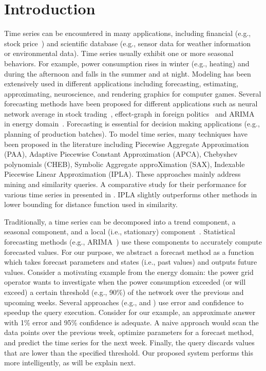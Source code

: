 \documentclass[10pt,conference,letterpaper]{IEEEtran}
\begin{document}
\section{Introduction}
  \label{sec:intro}
Time series can be encountered in many applications, including financial (e.g., stock price~\cite{stock}) and scientific database (e.g.,
sensor data for weather information~\cite{arimaEng} or environmental data).
Time series usually exhibit one or more seasonal behaviors. For example, power consumption rises in winter (e.g., heating) and during the afternoon and falls in the summer and at night. Modeling has been extensively used in different applications including forecasting, estimating, approximating, neuroscience, and rendering graphics for computer games.  Several  forecasting methods have been proposed for different applications such as neural network  average in stock trading~\cite{stock},  effect-graph in foreign politics~\cite{iran} and ARIMA~\cite{tBOX76a} in energy domain~\cite{arimaEng}.  Forecasting is essential for  decision making applications (e.g., planning of production batches). To model time series, many techniques have been proposed in the literature including Piecewise Aggregate Approximation (PAA), Adaptive Piecewise Constant Approximation (APCA), Chebyshev polynomials (CHEB), Symbolic Aggregate approXimation (SAX), Indexable Piecewise Linear Approximation (IPLA).  These approaches mainly address mining and similarity  queries.  A comparative study for their performance for various time series in presented in \cite{DTPE08}. IPLA slightly outperforms other methods in lower bounding for distance function used in similarity.

Traditionally, a time series  can be decomposed into a trend component, a seasonal component, and a local (i.e., stationary) component~\cite{Decompose}. 
Statistical  forecasting methods (e.g., ARIMA~\cite{tBOX76a}) use these components  to accurately compute forecasted values. For our purpose, we abstract a forecast method as a function which takes forecast parameters and states (i.e., past values) and outputs  future values.
Consider a motivating example from the energy domain: the power grid operator wants to investigate when the power consumption exceeded (or will exceed) a certain threshold (e.g., 90\%) of the network  over the previous and upcoming weeks. Several approaches (e.g.,\cite{AG99} and \cite{KML10}) use error and confidence to speedup the query execution. Consider for our example, an approximate answer with 1\% error  and 95\% confidence is adequate. A naive approach would scan the data points over the previous week, optimize parameters for a forecast method, and predict the time series for the next week. Finally, the query discards values that are lower than the specified threshold. Our proposed system performs this more intelligently, as will be explain next. 
\end{document}
